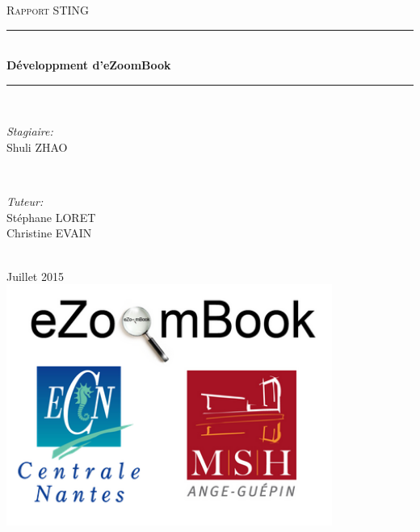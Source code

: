 \documentclass{report}
\newcommand{\HRule}{\rule{\linewidth}{0.5mm}}
\begin{document}
\begin{spacing}{1.5}
\begin{titlepage}

\center

\textsc{\LARGE Rapport STING}\\[0.5cm]

\HRule \\[0.4cm]
{ \huge \bfseries Développment d'eZoomBook}\\[0.4cm]
\HRule \\[1.5cm]

\begin{minipage}{0.5\textwidth}
\begin{flushleft} \large
\emph{Stagiaire:}\\
Shuli \textsc{ZHAO}\\
\end{flushleft}
\end{minipage}
~
\begin{minipage}{0.4\textwidth}
\begin{flushleft} \large
\emph{Tuteur:}\\
Stéphane \textsc{LORET} \\
Christine \textsc{EVAIN} \\
\end{flushleft}
\end{minipage}\\[1cm]


{\large Juillet 2015}\\[2.5cm]

\includegraphics[width=0.8\textwidth]{logo.png}\\[1cm]
\vfill
\end{titlepage}


\tableofcontents






\end{spacing}
\end{document}
